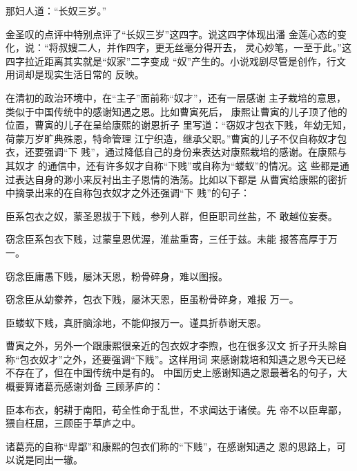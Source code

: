 {\bookkai 那妇人道：“长奴三岁。”}%
\par
金圣叹的点评中特别点评了“长奴三岁”这四字。说这四字体现出潘%
金莲心态的变化，说：“将叔嫂二人，并作四字，更无丝毫分得开去，%
灵心妙笔，一至于此。”这四字拉近距离其实就是“奴家”二字变成%
“奴”产生的。小说戏剧尽管是创作，行文用词却是现实生活日常的%
反映。%
\par
在清初的政治环境中，在“主子”面前称“奴才”，还有一层感谢%
主子栽培的意思，类似于中国传统中的感谢知遇之恩。比如曹寅死后，%
康熙让曹寅的儿子顶了他的位置，曹寅的儿子在呈给康熙的谢恩折子%
里写道：“窃奴才包衣下贱，年幼无知，荷蒙万岁旷典殊恩，特命管理%
江宁织造，继承父职。”曹寅的儿子不仅自称奴才包衣，还要强调“下%
贱”，通过降低自己的身份来表达对康熙栽培的感谢。在康熙与其奴才%
的通信中，还有许多奴才自称“下贱”或自称为“蝼蚁”的情况。这%
些都是通过表达自身的渺小来反衬出主子恩情的浩荡。比如以下都是%
从曹寅给康熙的密折中摘录出来的在自称包衣奴才之外还强调“下%
贱”的句子：%
\par
{\bookkai 臣系包衣之奴，蒙圣恩拔于下贱，参列人群，但臣职司丝盐，不}%
{\bookkai 敢越位妄奏。}%
\par
{\bookkai 窃念臣系包衣下贱，过蒙皇恩优渥，淮盐重寄，三任于兹。未能}%
{\bookkai 报答高厚于万一。}%
\par
{\bookkai 窃念臣庸愚下贱，屡沐天恩，粉骨碎身，难以图报。}%
\par
{\bookkai 窃念臣从幼豢养，包衣下贱，屡沐天恩，臣虽粉骨碎身，难报}%
{\bookkai 万一。}%
\par
{\bookkai 臣蝼蚁下贱，真肝脑涂地，不能仰报万一。谨具折恭谢天恩。}%
\par
曹寅之外，另外一个跟康熙很亲近的包衣奴才李煦，也在很多汉文%
折子开头除自称“包衣奴才”之外，还要强调“下贱”。这样用词%
来感谢栽培和知遇之恩今天已经不存在了，但在中国传统中是有的。%
中国历史上感谢知遇之恩最著名的句子，大概要算诸葛亮感谢刘备%
三顾茅庐的：%
\par
{\bookkai 臣本布衣，躬耕于南阳，苟全性命于乱世，不求闻达于诸侯。先}%
{\bookkai 帝不以臣卑鄙，猥自枉屈，三顾臣于草庐之中。}%
\par
诸葛亮的自称“卑鄙”和康熙的包衣们称的“下贱”，在感谢知遇之%
恩的思路上，可以说是同出一辙。%
